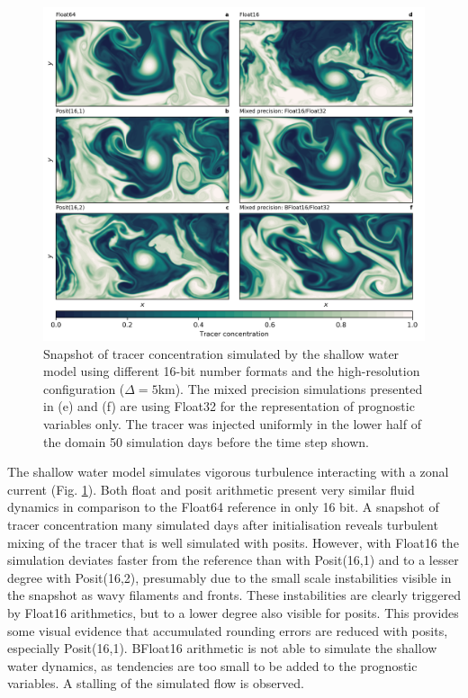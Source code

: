 \documentclass[draft]{agujournal2019}
\begin{document}
\begin{figure}
\includegraphics[width=1\textwidth]{snapshot.png}
\caption{Snapshot of tracer concentration simulated by the shallow water model
using different 16-bit number formats and the high-resolution configuration
($\Delta = 5$km). The mixed precision simulations presented in (e) and (f) are
using Float32 for the representation of prognostic variables only. The tracer
was injected uniformly in the lower half of the domain 50 simulation days before
the time step shown.}
\label{fig:snapshot}
\end{figure}

The shallow water model simulates vigorous turbulence interacting with a
zonal current (Fig. \ref{fig:snapshot}). Both float and posit arithmetic
present very similar fluid dynamics in comparison to the Float64 reference in
only 16 bit. A snapshot of tracer concentration many simulated days after
initialisation reveals turbulent mixing of the tracer that is well simulated
with posits. However, with Float16 the simulation deviates faster from the
reference than with Posit(16,1) and to a lesser degree with Posit(16,2),
presumably due to the small scale instabilities visible in the snapshot as
wavy filaments and fronts. These instabilities are clearly triggered by Float16
arithmetics, but to a lower degree also visible for posits. This provides some
visual evidence that accumulated rounding errors are reduced with posits, especially
Posit(16,1). BFloat16 arithmetic is not able to simulate the shallow water dynamics,
as tendencies are too small to be added to the prognostic variables. A stalling
of the simulated flow is observed. 
\end{document}
